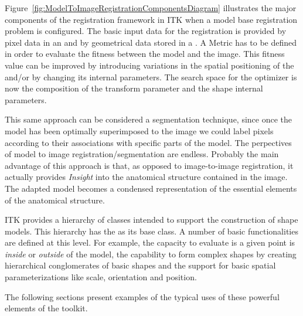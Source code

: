 Figure~\ref{fig:ModelToImageRegistrationComponentsDiagram} illustrates the
major components of the registration framework in ITK when a model base
registration problem is configured. The basic input data for the registration
is provided by pixel data in an  and by geometrical data stored
in a . A Metric has to be defined in order to evaluate
the fitness between the model and the image. This fitness value can be improved
by introducing variations in the spatial positioning of the
 and/or by changing its internal parameters. The search
space for the optimizer is now the composition of the transform parameter and
the shape internal parameters.

This same approach can be considered a segmentation technique, since once the
model has been optimally superimposed to the image we could label pixels
according to their associations with specific parts of the model. The
perpectives of model to image registration/segmentation are endless.  Probably
the main advantage of this approach is that, as opposed to image-to-image
registration, it actually provides \emph{Insight} into the anatomical structure
contained in the image. The adapted model becomes a condensed representation of
the essential elements of the anatomical structure.

ITK provides a hierarchy of classes intended to support the construction of
shape models. This hierarchy has the  as its base class.
A number of basic functionalities are defined at this level. For example, the
capacity to evaluate is a given point is \emph{inside} or \emph{outside} of the
model, the capability to form complex shapes by creating hierarchical
conglomerates of basic shapes and the support for basic spatial
parameterizations like scale, orientation and position.

The following sections present examples of the typical uses of these powerful
elements of the toolkit.

 




